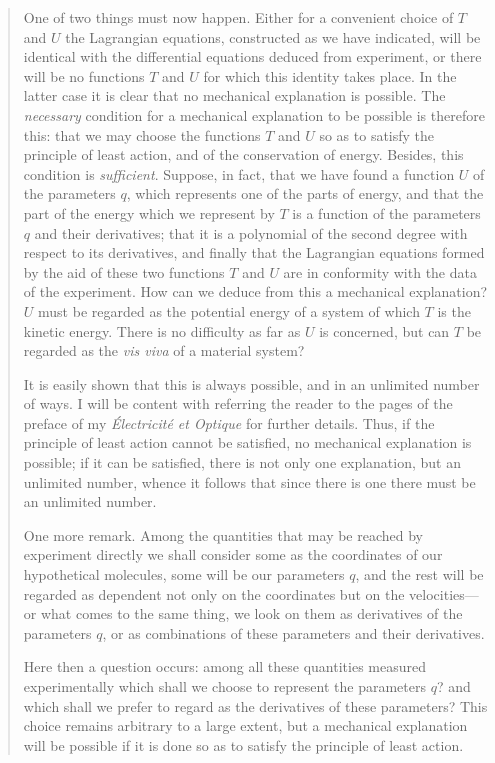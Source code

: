 \documentclass{article}
\begin{document}
\begin{quote}
    One of two things must now happen.  Either for a convenient choice of $T$ and $U$ the Lagrangian equations, constructed as we have indicated, will be identical with the differential equations deduced from experiment, or there will be no functions $T$ and $U$ for which this identity takes place.  In the latter case it is clear that no mechanical explanation is possible.  The \emph{necessary} condition for a mechanical explanation to be possible is therefore this: that we may choose the functions $T$ and $U$ so as to satisfy the principle of least action, and of the conservation of energy.  Besides, this condition is \emph{sufficient}.  Suppose, in fact, that we have found a function $U$ of the parameters $q$, which represents one of the parts of energy, and that the part of the energy which we represent by $T$ is a function of the parameters $q$ and their derivatives; that it is a polynomial of the second degree with respect to its derivatives, and finally that the Lagrangian equations formed by the aid of these two functions $T$ and $U$ are in conformity with the data of the experiment.  How can we deduce from this a mechanical explanation?  $U$ must be regarded as the potential energy of a system of which $T$ is the kinetic energy.  There is no difficulty as far as $U$ is concerned, but can $T$ be regarded as the \emph{vis viva} of a material system?
    
    It is easily shown that this is always possible, and in an unlimited number of ways.  I will be content with referring the reader to the pages of the preface of my \emph{\'Electricit\'e et Optique} for further details.  Thus, if the principle of least action cannot be satisfied, no mechanical explanation is possible; if it can be satisfied, there is not only one explanation, but an unlimited number, whence it follows that since there is one there must be an unlimited number.
    
    One more remark.  Among the quantities that may be reached by experiment directly we shall consider some as the coordinates of our hypothetical molecules, some will be our parameters $q$, and the rest will be regarded as dependent not only on the coordinates but on the velocities---or what comes to the same thing, we look on them as derivatives of the parameters $q$, or as combinations of these parameters and their derivatives.
    
    Here then a question occurs: among all these quantities measured experimentally which shall we choose to represent the parameters $q$? and which shall we prefer to regard as the derivatives of these parameters?  This choice remains arbitrary to a large extent, but a mechanical explanation will be possible if it is done so as to satisfy the principle of least action.
    

\end{quote}
\end{document}

